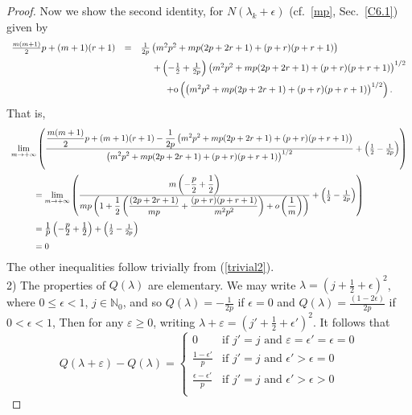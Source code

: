 \documentclass[11pt,a4paper,times]{amsart}
\theoremstyle{plain}
\theoremstyle{definition}
\numberwithin{equation}{section}
\newcommand{\ds}{\displaystyle}
\newcommand{\eqskip}{ \vspace*{2mm}\\ }
\newcommand{\so}{{\rm o}}
\newcommand{\fr}[2]{\frac{\ds #1}{\ds #2}}
\begin{document}
{\begin{proof}
Now we show the second identity, for $N(\lambda_k+\epsilon)$ (cf.\ {\ref{mp}}, Sec.\ \ref{C6.1}) given by
\begin{gather*}
\begin{array}{lll}
\frac{m(m+1)}{2}p +(m+1)(r+1)
&=& \frac{1}{2p}\left( m^2p^2+ mp(2p+2r+1) + (p+r)(p+r+1)\right)\eqskip
&&\hspace*{5mm}+\left( -\frac{1}{2} +\frac{1}{2p}\right)\left( m^2p^2+ mp(2p+2r+1) + (p+r)(p+r+1)\right)^{1/2}\eqskip
&& \hspace*{10mm}
+\so\left(\left( m^2p^2+ mp(2p+2r+1) + (p+r)(p+r+1)\right)^{1/2}\right).
\end{array}
\end{gather*}
That is, 
\begin{gather*}
\begin{array}{l}
{\ds \lim_{m\to +\infty}}\left(\fr{\frac{m(m+1)}{2}p +(m+1)(r+1)
-\frac{1}{2p}\left( m^2p^2+ mp(2p+2r+1) + (p+r)(p+r+1)\right)}{\left( m^2p^2+ mp(2p+2r+1) + (p+r)(p+r+1)\right)^{1/2}} + \left( \frac{1}{2}-\frac{1}{2p}\right)\right)\eqskip
\hspace*{1cm}={\ds \lim_{m\to +\infty}}
\left(\fr{m\left( -\frac{p}{2}+\frac{1}{2}\right)}{mp\left( 1+ \frac{1}{2}\left(\frac{(2p+2r+1)}{mp} + \frac{(p+r)(p+r+1)}{m^2p^2}\right)+o\left(\frac{1}{m}\right)\right)}
+ \left( \frac{1}{2}-\frac{1}{2p}\right)
\right)\eqskip
\hspace*{1cm}= \fr{1}{p}\left( -\fr{p}{2}+\fr{1}{2}\right)
+ \left( \frac{1}{2}-\frac{1}{2p}\right)\eqskip
\hspace*{1cm}=0
\end{array}
\end{gather*} 
The other inequalities follow trivially from (\ref{trivial2}).\\[1mm]
%
2) The properties of $Q(\lambda)$ are elementary. We may write $\lambda=(j+\frac{1}{2}+\epsilon)^2$, where  $0\leq \epsilon <1$, $j\in \mathbb{N}_0$, and so $Q(\lambda)=-\frac{1}{2p}$ if $\epsilon=0$ and $Q(\lambda)=\frac{(1-2\epsilon)}{2p}$ if $0<\epsilon<1$,
Then for any $\varepsilon\geq 0$, writing
$\lambda + \varepsilon= (j'+\frac{1}{2}+ \epsilon')^2$. It follows that
\[ Q(\lambda+\varepsilon)-Q(\lambda)= \left\{
\begin{array}{cll}
0& \mbox{if~} j'=j \mbox{~and~} \varepsilon=\epsilon'=\epsilon=0\\
\fr{1-\epsilon'}{p} & \mbox{if~} j'=j \mbox{~and~} \epsilon'>\epsilon=0\\
\fr{\epsilon-\epsilon'}{p} & \mbox{if~} j'=j \mbox{~and~} \epsilon'>\epsilon>0\\

\end{array}\]
\end{proof}}
\end{document}
